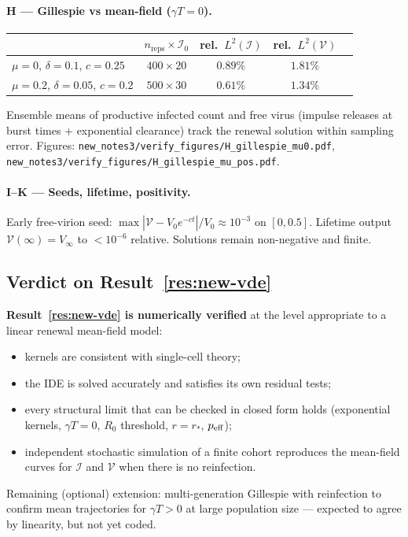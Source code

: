 \documentclass[11pt,a4paper]{article}
\newcommand{\Icell}{\mathcal{I}}
\newcommand{\Vfree}{\mathcal{V}}
\theoremstyle{plain}
\theoremstyle{definition}
\theoremstyle{remark}
\begin{document}
\paragraph{H --- Gillespie vs mean-field ($\gamma T=0$).}
\begin{center}
\begin{tabular}{@{}lcccc@{}}
\toprule
 & $n_{\mathrm{reps}}\times \Icell_0$ & rel.\ $L^2(\Icell)$ & rel.\ $L^2(\Vfree)$ \\
\midrule
$\mu=0$, $\delta=0.1$, $c=0.25$ & $400\times 20$ & $0.89\%$ & $1.81\%$ \\
$\mu=0.2$, $\delta=0.05$, $c=0.2$ & $500\times 30$ & $0.61\%$ & $1.34\%$ \\
\bottomrule
\end{tabular}
\end{center}
Ensemble means of productive infected count and free virus (impulse releases at
burst times + exponential clearance) track the renewal solution within sampling
error. Figures:
\texttt{new\_notes3/verify\_figures/H\_gillespie\_mu0.pdf},
\texttt{new\_notes3/verify\_figures/H\_gillespie\_mu\_pos.pdf}.

\paragraph{I--K --- Seeds, lifetime, positivity.}
Early free-virion seed: $\max|\Vfree-V_0 e^{-ct}|/V_0 \approx 10^{-3}$ on
$[0,0.5]$. Lifetime output $\Vfree(\infty)=V_\infty$ to $<10^{-6}$ relative.
Solutions remain non-negative and finite.

\subsection{Verdict on Result~\ref{res:new-vde}}

\begin{framed}
\textbf{Result~\ref{res:new-vde} is numerically verified} at the level appropriate
to a linear renewal mean-field model:
\begin{itemize}[leftmargin=1.2em]
\item kernels are consistent with single-cell theory;
\item the IDE is solved accurately and satisfies its own residual tests;
\item every structural limit that can be checked in closed form holds
  (exponential kernels, $\gamma T=0$, $R_0$ threshold, $r=r_*$, $p_{\rm eff}$);
\item independent stochastic simulation of a finite cohort reproduces the
  mean-field curves for $\Icell$ and $\Vfree$ when there is no reinfection.
\end{itemize}
Remaining (optional) extension: multi-generation Gillespie with reinfection to
confirm mean trajectories for $\gamma T>0$ at large population size --- expected
to agree by linearity, but not yet coded.
\end{framed}
\end{document}
